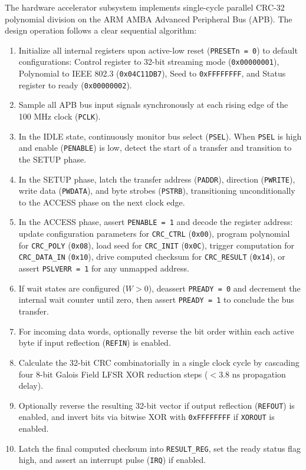 \documentclass[11pt,a4paper,twoside]{article}
\begin{document}
The hardware accelerator subsystem implements single-cycle parallel CRC-32 polynomial division on the ARM AMBA Advanced Peripheral Bus (APB). The design operation follows a clear sequential algorithm:

\begin{enumerate}
    \setlength{\itemsep}{3.5pt}
    \setlength{\parskip}{0pt}
    \item Initialize all internal registers upon active-low reset (\texttt{PRESETn = 0}) to default configurations: Control register to 32-bit streaming mode (\texttt{0x00000001}), Polynomial to IEEE 802.3 (\texttt{0x04C11DB7}), Seed to \texttt{0xFFFFFFFF}, and Status register to ready (\texttt{0x00000002}).
    \item Sample all APB bus input signals synchronously at each rising edge of the 100 MHz clock (\texttt{PCLK}).
    \item In the IDLE state, continuously monitor bus select (\texttt{PSEL}). When \texttt{PSEL} is high and enable (\texttt{PENABLE}) is low, detect the start of a transfer and transition to the SETUP phase.
    \item In the SETUP phase, latch the transfer address (\texttt{PADDR}), direction (\texttt{PWRITE}), write data (\texttt{PWDATA}), and byte strobes (\texttt{PSTRB}), transitioning unconditionally to the ACCESS phase on the next clock edge.
    \item In the ACCESS phase, assert \texttt{PENABLE = 1} and decode the register address: update configuration parameters for \texttt{CRC\_CTRL} (\texttt{0x00}), program polynomial for \texttt{CRC\_POLY} (\texttt{0x08}), load seed for \texttt{CRC\_INIT} (\texttt{0x0C}), trigger computation for \texttt{CRC\_DATA\_IN} (\texttt{0x10}), drive computed checksum for \texttt{CRC\_RESULT} (\texttt{0x14}), or assert \texttt{PSLVERR = 1} for any unmapped address.
    \item If wait states are configured ($W > 0$), deassert \texttt{PREADY = 0} and decrement the internal wait counter until zero, then assert \texttt{PREADY = 1} to conclude the bus transfer.
    \item For incoming data words, optionally reverse the bit order within each active byte if input reflection (\texttt{REFIN}) is enabled.
    \item Calculate the 32-bit CRC combinatorially in a single clock cycle by cascading four 8-bit Galois Field LFSR XOR reduction steps ($<3.8\text{ ns}$ propagation delay).
    \item Optionally reverse the resulting 32-bit vector if output reflection (\texttt{REFOUT}) is enabled, and invert bits via bitwise XOR with \texttt{0xFFFFFFFF} if \texttt{XOROUT} is enabled.
    \item Latch the final computed checksum into \texttt{RESULT\_REG}, set the ready status flag high, and assert an interrupt pulse (\texttt{IRQ}) if enabled.
\end{enumerate}
\end{document}

